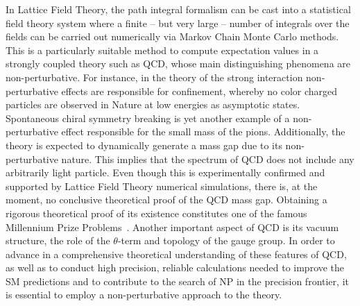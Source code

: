 In Lattice Field Theory, the path integral  formalism can be cast into a statistical field theory system where a finite -- but very large -- number of integrals over the fields can be carried out numerically via Markov Chain Monte Carlo methods. This is a particularly suitable method to compute expectation values in a strongly coupled theory such as QCD, whose main distinguishing phenomena are non-perturbative. For instance, in the theory of the strong interaction non-perturbative effects are responsible for confinement, whereby no color charged particles are observed in Nature at low energies as asymptotic states. Spontaneous chiral symmetry breaking is yet another example of a non-perturbative effect responsible for the small mass of the pions. Additionally, the theory is expected to dynamically generate a mass gap due to its non-perturbative nature. This implies that the spectrum of QCD does not include any arbitrarily light particle. Even though this is experimentally confirmed and supported by Lattice Field Theory numerical simulations, there is, at the moment, no conclusive theoretical proof of the QCD mass gap. Obtaining a rigorous theoretical proof of its existence constitutes one of the famous Millennium Prize Problems~\citep{MillenniumPrizeproblems}. Another important aspect of QCD is its vacuum structure, the role of the $\theta$-term and topology of the gauge group. In order to advance in a comprehensive theoretical understanding of these features of QCD, as well as to conduct high precision, reliable calculations needed to improve the SM predictions and to contribute to the search of NP in the precision frontier, it is essential to employ a non-perturbative approach to the theory.

